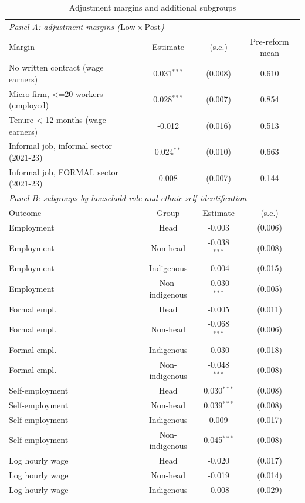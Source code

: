 \begin{table}[!tbp]\centering
\caption{Adjustment margins and additional subgroups}\label{tab:margins}
\begin{threeparttable}
\footnotesize
\begin{tabular}{lccc}
\toprule
\multicolumn{4}{l}{\emph{Panel A: adjustment margins ($\mathrm{Low}\times\mathrm{Post}$)}}\\
Margin & Estimate & (s.e.) & Pre-reform mean \\
\midrule
No written contract (wage earners) & 0.031$^{***}$ & (0.008) & 0.610 \\
Micro firm, <=20 workers (employed) & 0.028$^{***}$ & (0.007) & 0.854 \\
Tenure < 12 months (wage earners) & -0.012 & (0.016) & 0.513 \\
Informal job, informal sector (2021-23) & 0.024$^{**}$ & (0.010) & 0.663 \\
Informal job, FORMAL sector (2021-23) & 0.008 & (0.007) & 0.144 \\
\midrule
\multicolumn{4}{l}{\emph{Panel B: subgroups by household role and ethnic self-identification}}\\
Outcome & Group & Estimate & (s.e.) \\ \midrule
Employment & Head & -0.003 & (0.006) \\
Employment & Non-head & -0.038$^{***}$ & (0.008) \\
Employment & Indigenous & -0.004 & (0.015) \\
Employment & Non-indigenous & -0.030$^{***}$ & (0.005) \\
Formal empl. & Head & -0.005 & (0.011) \\
Formal empl. & Non-head & -0.068$^{***}$ & (0.006) \\
Formal empl. & Indigenous & -0.030 & (0.018) \\
Formal empl. & Non-indigenous & -0.048$^{***}$ & (0.008) \\
Self-employment & Head & 0.030$^{***}$ & (0.008) \\
Self-employment & Non-head & 0.039$^{***}$ & (0.008) \\
Self-employment & Indigenous & 0.009 & (0.017) \\
Self-employment & Non-indigenous & 0.045$^{***}$ & (0.008) \\
Log hourly wage & Head & -0.020 & (0.017) \\
Log hourly wage & Non-head & -0.019 & (0.014) \\
Log hourly wage & Indigenous & -0.008 & (0.029) \\

\end{tabular}
\end{threeparttable}
\end{table}
